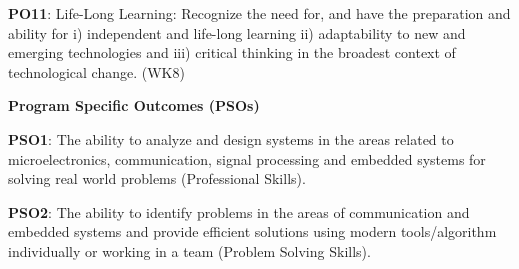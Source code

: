 \begin{titlepage}
\textbf{PO11}: Life-Long Learning: Recognize the need for, and have the preparation and ability for i) independent and life-long learning ii) adaptability to new and emerging technologies and iii) critical thinking in the broadest context of technological change. (WK8)

\vspace{0.5cm}

\textbf{Program Specific Outcomes (PSOs)}

\textbf{PSO1}: The ability to analyze and design systems in the areas related to microelectronics, communication, signal processing and embedded systems for solving real world problems (Professional Skills).

\textbf{PSO2}: The ability to identify problems in the areas of communication and embedded systems and provide efficient solutions using modern tools/algorithm individually or working in a team (Problem Solving Skills).

\end{titlepage}